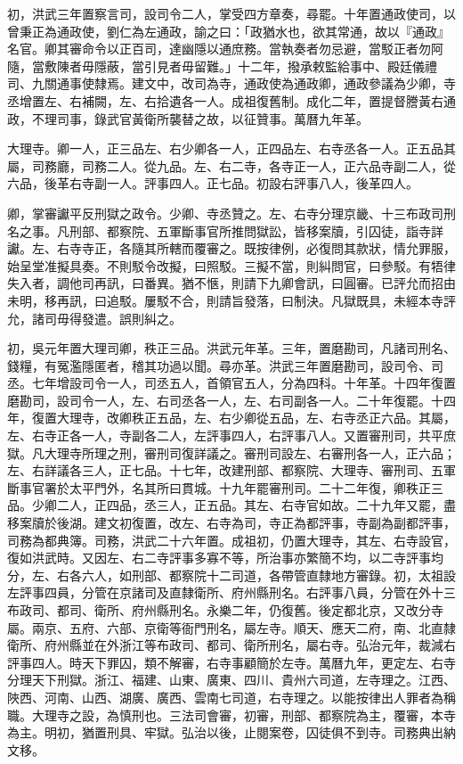 初，洪武三年置察言司，設司令二人，掌受四方章奏，尋罷。十年置通政使司，以曾秉正為通政使，劉仁為左通政，諭之曰：「政猶水也，欲其常通，故以『通政』名官。卿其審命令以正百司，達幽隱以通庶務。當執奏者勿忌避，當駁正者勿阿隨，當敷陳者毋隱蔽，當引見者毋留難。」十二年，撥承敕監給事中、殿廷儀禮司、九關通事使隸焉。建文中，改司為寺，通政使為通政卿，通政參議為少卿，寺丞增置左、右補闕，左、右拾遺各一人。成祖復舊制。成化二年，置提督謄黃右通政，不理司事，錄武官黃衛所襲替之故，以征贊事。萬曆九年革。

大理寺。卿一人，正三品左、右少卿各一人，正四品左、右寺丞各一人。正五品其屬，司務廳，司務二人。從九品。左、右二寺，各寺正一人，正六品寺副二人，從六品，後革右寺副一人。評事四人。正七品。初設右評事八人，後革四人。

卿，掌審讞平反刑獄之政令。少卿、寺丞贊之。左、右寺分理京畿、十三布政司刑名之事。凡刑部、都察院、五軍斷事官所推問獄訟，皆移案牘，引囚徒，詣寺詳讞。左、右寺寺正，各隨其所轄而覆審之。既按律例，必復問其款狀，情允罪服，始呈堂准擬具奏。不則駁令改擬，曰照駁。三擬不當，則糾問官，曰參駁。有牾律失入者，調他司再訊，曰番異。猶不愜，則請下九卿會訊，曰圓審。已評允而招由未明，移再訊，曰追駁。屢駁不合，則請旨發落，曰制決。凡獄既具，未經本寺評允，諸司毋得發遣。誤則糾之。

初，吳元年置大理司卿，秩正三品。洪武元年革。三年，置磨勘司，凡諸司刑名、錢糧，有冤濫隱匿者，稽其功過以聞。尋亦革。洪武三年置磨勘司，設司令、司丞。七年增設司令一人，司丞五人，首領官五人，分為四科。十年革。十四年復置磨勘司，設司令一人，左、右司丞各一人，左、右司副各一人。二十年復罷。十四年，復置大理寺，改卿秩正五品，左、右少卿從五品，左、右寺丞正六品。其屬，左、右寺正各一人，寺副各二人，左評事四人，右評事八人。又置審刑司，共平庶獄。凡大理寺所理之刑，審刑司復詳議之。審刑司設左、右審刑各一人，正六品；左、右詳議各三人，正七品。十七年，改建刑部、都察院、大理寺、審刑司、五軍斷事官署於太平門外，名其所曰貫城。十九年罷審刑司。二十二年復，卿秩正三品。少卿二人，正四品，丞三人，正五品。其左、右寺官如故。二十九年又罷，盡移案牘於後湖。建文初復置，改左、右寺為司，寺正為都評事，寺副為副都評事，司務為都典簿。司務，洪武二十六年置。成祖初，仍置大理寺，其左、右寺設官，復如洪武時。又因左、右二寺評事多寡不等，所治事亦繁簡不均，以二寺評事均分，左、右各六人，如刑部、都察院十二司道，各帶管直隸地方審錄。初，太祖設左評事四員，分管在京諸司及直隸衛所、府州縣刑名。右評事八員，分管在外十三布政司、都司、衛所、府州縣刑名。永樂二年，仍復舊。後定都北京，又改分寺屬。兩京、五府、六部、京衛等衙門刑名，屬左寺。順天、應天二府，南、北直隸衛所、府州縣並在外浙江等布政司、都司、衛所刑名，屬右寺。弘治元年，裁減右評事四人。時天下罪囚，類不解審，右寺事顧簡於左寺。萬曆九年，更定左、右寺分理天下刑獄。浙江、福建、山東、廣東、四川、貴州六司道，左寺理之。江西、陜西、河南、山西、湖廣、廣西、雲南七司道，右寺理之。以能按律出人罪者為稱職。大理寺之設，為慎刑也。三法司會審，初審，刑部、都察院為主，覆審，本寺為主。明初，猶置刑具、牢獄。弘治以後，止閱案卷，囚徒俱不到寺。司務典出納文移。

